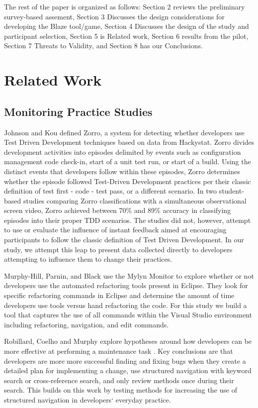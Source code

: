 \documentclass{sig-alternate}
\begin{document}
The rest of the paper is organized as follows:  Section 2 reviews the preliminary survey-based assement, Section 3 Discusses the design considerations for developing the Blaze tool/game, Section 4 Discusses the design of the study and participant selection, Section 5 is Related work, Section 6 results from the pilot, Section 7 Threats to Validity, and Section 8 has our Conclusions.


\section{Related Work}
\subsection{Monitoring Practice Studies }
Johnson and Kou defined Zorro\cite{V:Johnson2007Automated}, a system for detecting whether developers use Test Driven Development techniques based on data from Hackystat.  Zorro divides development activities into episodes delimited by events such as configuration management code check-in, start of a unit test run, or start of a build.  Using the distinct events that developers follow within these episodes, Zorro determines whether the episode followed Test-Driven Development practices per their classic definition of test first - code - test pass, or a different scenario.  In two student-based studies comparing Zorro classifications with a simultaneous observational screen video, Zorro achieved between 70\% \cite{Kou2010Operational} and 89\% \cite{V:Johnson2007Automated} accuracy in classifying episodes into their proper TDD scenarios.  The studies did not, however, attempt to use or evaluate the influence of instant feedback aimed at encouraging participants to follow the classic definition of Test Driven Development.  In our study, we attempt this leap to present data collected directly to developers attempting to influence them to change their practices.

Murphy-Hill, Parnin, and Black \cite{V:MurphyHill2012How} use the Mylyn Monitor to explore whether or not developers use the automated refactoring tools present in Eclipse.  They look for specific refactoring commands in Eclipse and determine the amount of time developers use tools versus hand refactoring the code.  For this study we build a tool that captures the use of all commands within the Visual Studio environment including refactoring, navigation, and edit commands.

Robillard, Coelho and Murphy explore hypotheses around how developers can be more effective at performing a maintenance task \cite{wbsnipes:Robillard2004How}.  Key conclusions are that developers are more more successful finding and fixing bugs when they create a detailed plan for implementing a change, use structured navigation with keyword search or cross-reference search, and only review methods once during their search.  This builds on this work by testing methods for increasing the use of structured navigation in developers` everyday practice.
\end{document}
